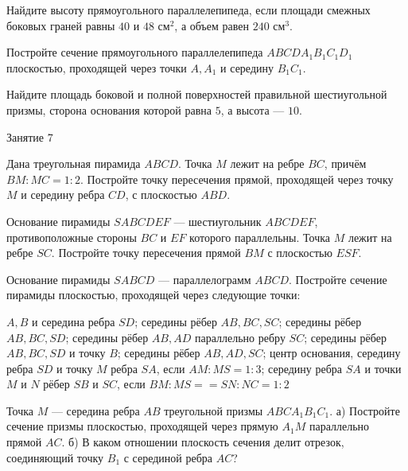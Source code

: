 \begin{class}[number=6]
\begin{listofex}
		\item Найдите высоту прямоугольного параллелепипеда, если площади смежных боковых граней равны \(40\) и \(48\) см\(^2\), а объем равен \(240\) см\(^3\).
		\item Постройте сечение прямоугольного параллелепипеда \(ABCDA_1B_1C_1D_1\)
		плоскостью, проходящей через точки \(A, A_1\) и середину \(B_1C_1\).
		\item Найдите площадь боковой и полной поверхностей правильной шестиугольной призмы, сторона основания которой равна \(5\), а высота --- \(10\).
	\end{listofex}
\end{class}

\begin{class}[number=7]
	\begin{listofex}
		\item Занятие 7
	\end{listofex}
\end{class}

\begin{homework}[number=2]
	\begin{listofex}
		\item Дана треугольная пирамида \(ABCD\). Точка \(M\) лежит на ребре \(BC\), причём \(BM:MC = 1:2\). Постройте точку пересечения прямой, проходящей через точку \(M\) и середину ребра \(CD\), с плоскостью \(ABD\).
		\item Основание пирамиды \(SABCDEF\) --- шестиугольник \(ABCDEF\), противоположные стороны \(BC\) и \(EF\) которого параллельны. Точка \(M\) лежит на ребре \(SC\). Постройте точку пересечения прямой \(BM\) с плоскостью \(ESF\).
		\item Основание пирамиды \(SABCD\) --- параллелограмм \(ABCD\). Постройте сечение пирамиды плоскостью, проходящей через следующие точки:
		\begin{itasks}[1]
			\task \(A, B\) и середина ребра \(SD\);
			\task середины рёбер \(AB, BC, SC\);
			\task середины рёбер \(AB, BC, SD\);
			\task середины рёбер \(AB, AD\) параллельно ребру \(SC\);
			\task середины рёбер \(AB, BC, SD\) и точку \(B\);
			\task середины рёбер \(AB, AD, SC\);
			\task центр основания, середину ребра \(SD\) и точку \(M\) ребра \(SA\), если \(AM:MS = 1:3\);
			\task середину ребра \(SA\) и точки \(M\) и \(N\) рёбер \(SB\) и \(SC\), если \(BM : MS = = SN :NC=1:2\)
		\end{itasks}
		\item Точка \(M\) — середина ребра \(AB\) треугольной призмы \(ABCA_1B_1C_1\). а) Постройте сечение призмы плоскостью, проходящей через прямую \(A_1M\) параллельно прямой \(AC\). б) В каком отношении плоскость сечения делит отрезок, соединяющий точку \(B_1\) с серединой ребра \(AC\)?
	\end{listofex}
\end{homework}

